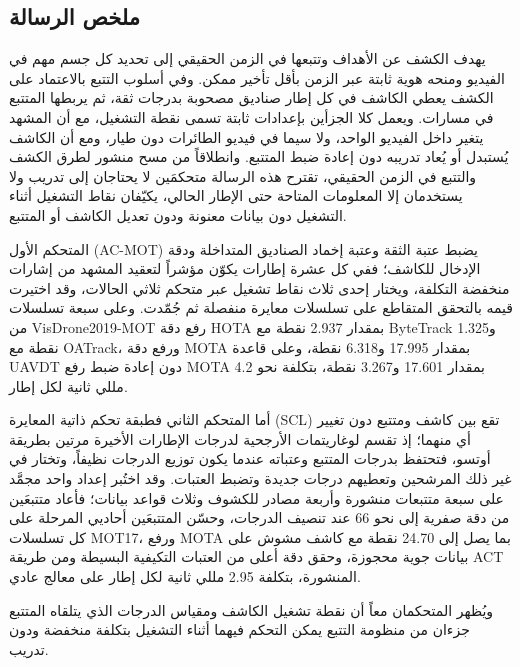\documentclass[12pt,a4paper]{article}
\begin{document}
\begin{otherlanguage}{arabic}
\section*{\LARGE ملخص الرسالة}
\thispagestyle{empty}

يهدف الكشف عن الأهداف وتتبعها في الزمن الحقيقي إلى تحديد كل جسم مهم في الفيديو ومنحه هوية ثابتة عبر الزمن بأقل تأخير ممكن. وفي أسلوب التتبع بالاعتماد على الكشف يعطي الكاشف في كل إطار صناديق مصحوبة بدرجات ثقة، ثم يربطها المتتبع في مسارات. ويعمل كلا الجزأين بإعدادات ثابتة تسمى نقطة التشغيل، مع أن المشهد يتغير داخل الفيديو الواحد، ولا سيما في فيديو الطائرات دون طيار، ومع أن الكاشف يُستبدل أو يُعاد تدريبه دون إعادة ضبط المتتبع. وانطلاقاً من مسح منشور لطرق الكشف والتتبع في الزمن الحقيقي، تقترح هذه الرسالة متحكمَين لا يحتاجان إلى تدريب ولا يستخدمان إلا المعلومات المتاحة حتى الإطار الحالي، يكيّفان نقاط التشغيل أثناء التشغيل دون بيانات معنونة ودون تعديل الكاشف أو المتتبع.

المتحكم الأول (\foreignlanguage{english}{AC-MOT}) يضبط عتبة الثقة وعتبة إخماد الصناديق المتداخلة ودقة الإدخال للكاشف؛ ففي كل عشرة إطارات يكوّن مؤشراً لتعقيد المشهد من إشارات منخفضة التكلفة، ويختار إحدى ثلاث نقاط تشغيل عبر متحكم ثلاثي الحالات، وقد اختيرت قيمه بالتحقق المتقاطع على تسلسلات معايرة منفصلة ثم جُمّدت. وعلى سبعة تسلسلات من \foreignlanguage{english}{VisDrone2019-MOT} رفع دقة \foreignlanguage{english}{HOTA} بمقدار \foreignlanguage{english}{2.937} نقطة مع \foreignlanguage{english}{ByteTrack} و\foreignlanguage{english}{1.325} نقطة مع \foreignlanguage{english}{OATrack}، ورفع دقة \foreignlanguage{english}{MOTA} بمقدار \foreignlanguage{english}{17.995} و\foreignlanguage{english}{6.318} نقطة، وعلى قاعدة \foreignlanguage{english}{UAVDT} دون إعادة ضبط رفع \foreignlanguage{english}{MOTA} بمقدار \foreignlanguage{english}{17.601} و\foreignlanguage{english}{3.267} نقطة، بتكلفة نحو \foreignlanguage{english}{4.2} مللي ثانية لكل إطار.

أما المتحكم الثاني فطبقة تحكم ذاتية المعايرة (\foreignlanguage{english}{SCL}) تقع بين كاشف ومتتبع دون تغيير أي منهما؛ إذ تقسم لوغاريتمات الأرجحية لدرجات الإطارات الأخيرة مرتين بطريقة أوتسو، فتحتفظ بدرجات المتتبع وعتباته عندما يكون توزيع الدرجات نظيفاً، وتختار في غير ذلك المرشحين وتعطيهم درجات جديدة وتضبط العتبات. وقد اختُبر إعداد واحد مجمَّد على سبعة متتبعات منشورة وأربعة مصادر للكشوف وثلاث قواعد بيانات؛ فأعاد متتبعَين من دقة صفرية إلى نحو \foreignlanguage{english}{66} عند تنصيف الدرجات، وحسّن المتتبعَين أحاديي المرحلة على كل تسلسلات \foreignlanguage{english}{MOT17}، ورفع \foreignlanguage{english}{MOTA} بما يصل إلى \foreignlanguage{english}{24.70} نقطة مع كاشف مشوش على بيانات جوية محجوزة، وحقق دقة أعلى من العتبات التكيفية البسيطة ومن طريقة \foreignlanguage{english}{ACT} المنشورة، بتكلفة \foreignlanguage{english}{2.95} مللي ثانية لكل إطار على معالج عادي.

ويُظهر المتحكمان معاً أن نقطة تشغيل الكاشف ومقياس الدرجات الذي يتلقاه المتتبع جزءان من منظومة التتبع يمكن التحكم فيهما أثناء التشغيل بتكلفة منخفضة ودون تدريب.


\clearpage
\end{otherlanguage}
\end{document}
